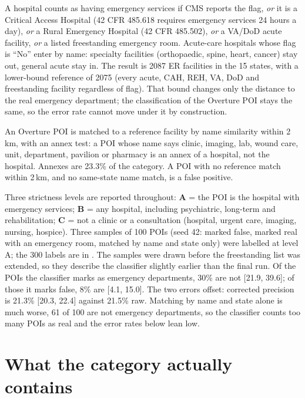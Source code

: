 \documentclass[a4paper]{article}
\begin{document}
A hospital counts as having emergency services if CMS reports the flag, \emph{or} it is a
Critical Access Hospital (42 CFR 485.618 requires emergency services 24 hours a day), \emph{or}
a Rural Emergency Hospital (42 CFR 485.502), \emph{or} a VA/DoD acute facility, \emph{or} a
listed freestanding emergency room. Acute-care hospitals whose flag is ``No'' enter by name: specialty
facilities (orthopaedic, spine, heart, cancer) stay out, general acute stay in. The result is
\num{2087} ER facilities in the 15 states, with a lower-bound reference of
\num{2075} (every acute, CAH, REH, VA, DoD and freestanding facility regardless of flag). That bound
changes only the distance to the real emergency department; the classification of the Overture
POI stays the same, so the error rate cannot move under it by construction.

An Overture POI is matched to a reference facility by name similarity within 2\,km, with an
annex test: a POI whose name says clinic, imaging, lab, wound care, unit, department,
pavilion or pharmacy is an annex of a hospital, not the hospital. Annexes are 23.3\% of the
category. A POI with no reference match within 2\,km,
and no same-state name match, is a false positive.

Three strictness levels are reported throughout: \textbf{A} = the POI is the hospital with
emergency services; \textbf{B} = any hospital, including psychiatric, long-term and
rehabilitation; \textbf{C} = not a clinic or a consultation (hospital, urgent care, imaging,
nursing, hospice). Three samples of 100 POIs (seed 42: marked false, marked real with an emergency
room, matched by name and state only) were labelled at level A; the 300 labels are in
.
The samples were drawn before the freestanding list was extended, so they describe the classifier
slightly earlier than the final run. Of the POIs the classifier marks as emergency departments, 30\% are
not [21.9, 39.6]; of those it marks false, 8\% are [4.1, 15.0]. The two errors offset: corrected precision is 21.3\% [20.3, 22.4] against
21.5\% raw. Matching by name and state alone is much worse, 61 of 100 are not emergency
departments, so the classifier counts too many POIs as real and the error rates below lean low.

\section{What the category actually contains}
\end{document}

